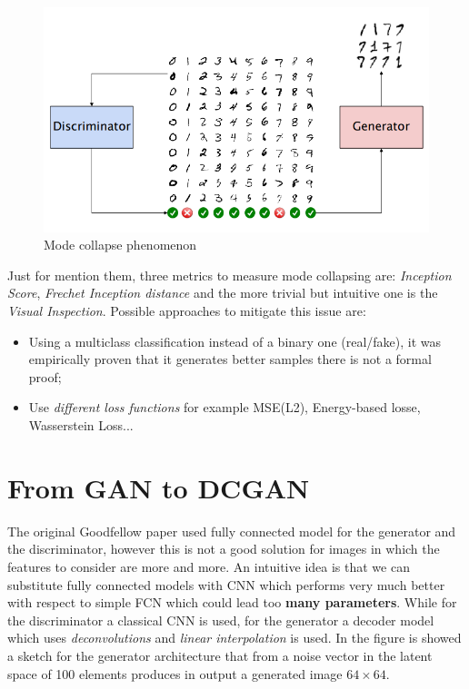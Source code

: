 \begin{figure}[h]
    \centering
    \includegraphics[scale=0.6]{img/mode.png}
    \caption{Mode collapse phenomenon}
\end{figure}

Just for mention them, three metrics to measure mode collapsing are: \textit{Inception Score}, \textit{Frechet Inception distance} and the more trivial but intuitive one is the \textit{Visual Inspection}.
Possible approaches to mitigate this issue are: 
\begin{itemize}
    \itemsep-0.3em
    \item Using a multiclass classification instead of a binary one (real/fake), it was empirically proven that it generates better samples there is not a formal proof; 
    \item Use \textit{different loss functions} for example MSE(L2), Energy-based losse, Wasserstein Loss...
\end{itemize}

\section{From GAN to DCGAN}
The original Goodfellow paper used fully connected model for the generator and the discriminator, however this is not a good solution for images in which the features to consider are more and more. An intuitive idea is that we can substitute fully connected models with CNN which performs very much better with respect to simple FCN which could lead too \textbf{many parameters}.  While for the discriminator a classical CNN is used, for the generator a decoder model which uses \textit{deconvolutions} and \textit{linear interpolation} is used. In the figure is showed a sketch for the generator architecture that from a noise vector in the latent space of 100 elements produces in output a generated  image $64\times64$.

